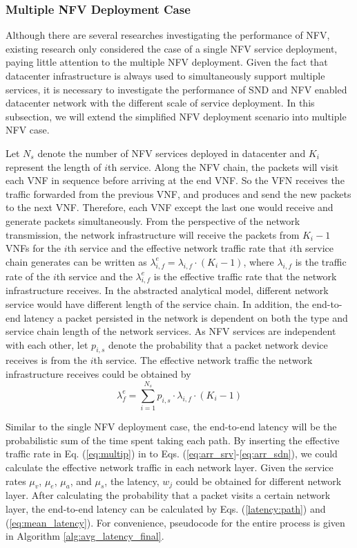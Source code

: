 \subsubsection{Multiple NFV Deployment Case} \label{multiple}
Although there are several researches investigating the performance of NFV, existing research only considered the case of a single NFV service deployment, paying little attention to the multiple NFV deployment. Given the fact that datacenter infrastructure is always used to simultaneously support multiple services, it is necessary to investigate the performance of SND and NFV enabled datacenter network with the different scale of service deployment. In this subsection, we will extend the simplified NFV deployment scenario into multiple NFV case. 

Let $N_s$ denote the number of NFV services deployed in datacenter and $K_i$ represent the length of $i$th service. Along the NFV chain, the packets will visit each VNF in sequence before arriving at the end VNF. So the VFN receives the traffic forwarded from the previous VNF, and produces and send the new packets to the next VNF. Therefore, each VNF except the last one would receive and generate packets simultaneously. From the perspective of the network transmission, the network infrastructure will receive the packets from $K_i-1$ VNFs for the $i$th service and the effective network traffic rate that $i$th service chain generates can be written as $\lambda_{i,f}^{e} = \lambda_{i,f} \cdot (K_i - 1)$, where $\lambda_{i,f}$ is the traffic rate of the $i$th service and the $\lambda_{i,f}^e$ is the effective traffic rate that the network infrastructure receives. In the abstracted analytical model, different network service would have different length of the service chain. In addition, the end-to-end latency a packet persisted in the network is dependent on both the type and service chain length of the network services. As NFV services are independent with each other, let $p_{i,s}$ denote the probability that a packet network device receives is from the $i$th service.
The effective network traffic the network infrastructure receives could be obtained by 
\begin{equation}
\label{eq:multip}
\lambda _{ f }^{ e }=\sum _{ i=1 }^{ { N }_{ s } }{p_{i,s} \cdot \lambda _{ i,f }\cdot (K_{ i }-1) }
\end{equation}

Similar to the single NFV deployment case, the end-to-end latency will be the probabilistic sum of the time spent taking each path. By inserting the effective traffic rate in Eq. (\ref{eq:multip}) in to Eqs. (\ref{eq:arr_srv}-\ref{eq:arr_sdn}), we could calculate the effective network traffic in each network layer. Given the service rates $\mu_v$, $\mu_e$, $\mu_a$, and $\mu_s$, the latency, $w_j$ could be obtained for different network layer. After calculating the probability that a packet visits a certain network layer, the end-to-end latency can be calculated by Eqs. (\ref{latency:path}) and (\ref{eq:mean_latency}). 
For convenience, pseudocode for the entire process is given in Algorithm \ref{alg:avg_latency_final}.

